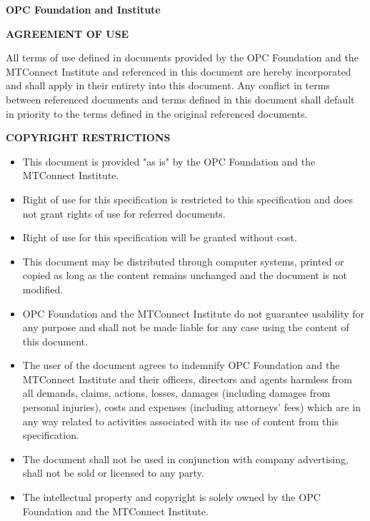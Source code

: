 \textbf{\Large {OPC Foundation and \mtconnect Institute}}

\begin{center}
    \textbf{AGREEMENT OF USE}
\end{center}

All terms of use defined in documents provided by the OPC Foundation and the MTConnect Institute and referenced in this document are hereby incorporated and shall apply in their entirety into this document.   Any conflict in terms between referenced documents and terms defined in this document shall default in priority to the terms defined in the original referenced documents.

\textbf{COPYRIGHT RESTRICTIONS}

\begin{itemize}
    \item This document is provided "as is" by the OPC Foundation and the MTConnect Institute.
    \item Right of use for this specification is restricted to this specification and does not grant rights of use for referred documents.
    \item Right of use for this specification will be granted without cost.
    \item This document may be distributed through computer systems, printed or copied as long as the content remains unchanged and the document is not modified.
    \item OPC Foundation and the MTConnect Institute do not guarantee usability for any purpose and shall not be made liable for any case using the content of this document.
    \item The user of the document agrees to indemnify OPC Foundation and the MTConnect Institute and their officers, directors and agents harmless from all demands, claims, actions, losses, damages (including damages from personal injuries), costs and expenses (including attorneys' fees) which are in any way related to activities associated with its use of content from this specification.
    \item The document shall not be used in conjunction with company advertising, shall not be sold or licensed to any party.
    
    \item The intellectual property and copyright is solely owned by the OPC Foundation and the MTConnect Institute.
\end{itemize}

